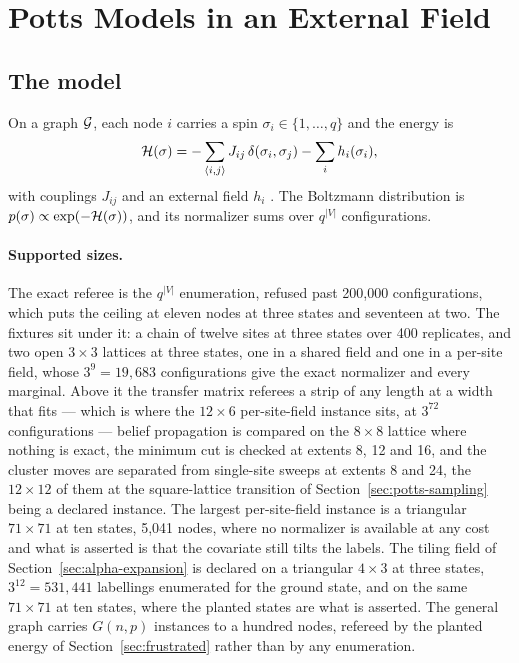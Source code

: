 \documentclass[11pt,a4paper]{article}
\begin{document}
\section{Potts Models in an External Field}
\label{sec:potts}

\subsection{The model}
\label{sec:potts:model}
On a graph $\mathcal{G}$, each node $i$ carries a spin $\sigma_i \in \{1, \dots, q\}$
and the energy is
\begin{equation}
  \mathcal{H}(\sigma) = -\sum_{\langle i,j \rangle} J_{ij}\,\delta(\sigma_i, \sigma_j)
                    - \sum_i h_i(\sigma_i),
  \label{eq:potts}
\end{equation}
with couplings $J_{ij}$ and an external field $h_i$ \citep{mezard2009}. The
Boltzmann distribution is $p(\sigma) \propto \exp(-\mathcal{H}(\sigma))$, and its
normalizer sums over $q^{|V|}$ configurations.

\paragraph{Supported sizes.}
\label{par:potts:sizes}
The exact referee is the $q^{|V|}$ enumeration, refused past 200,000
configurations, which puts the ceiling at eleven nodes at three states and
seventeen at two. The fixtures sit under it: a chain of twelve sites at three
states over 400 replicates, and two open $3 \times 3$ lattices at three
states, one in a shared field and one in a per-site field, whose
$3^9 = 19{,}683$ configurations give the exact normalizer and every marginal.
Above it the transfer matrix referees a strip of any length at a width that
fits --- which is where the $12 \times 6$ per-site-field instance sits, at
$3^{72}$ configurations --- belief propagation is compared on the
$8 \times 8$ lattice where nothing is exact, the minimum cut is checked at
extents 8, 12 and 16, and the cluster moves are separated from single-site
sweeps at extents 8 and 24, the $12 \times 12$ of them at the square-lattice
transition of Section~\ref{sec:potts-sampling} being a declared instance. The
largest per-site-field instance is a triangular $71 \times 71$ at ten states,
5,041 nodes, where no normalizer is available at any cost and what is asserted
is that the covariate still tilts the labels. The tiling field of
Section~\ref{sec:alpha-expansion} is declared on a triangular $4 \times 3$ at
three states, $3^{12} = 531{,}441$ labellings enumerated for the ground state,
and on the same $71 \times 71$ at ten states, where the planted states are
what is asserted. The general graph carries
$G(n, p)$ instances to a hundred nodes, refereed by the planted energy of
Section~\ref{sec:frustrated} rather than by any enumeration.
\end{document}
